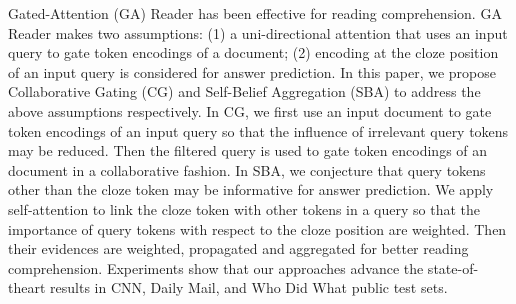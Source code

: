 Gated-Attention (GA) Reader has been effective for reading comprehension. GA Reader makes two assumptions: (1) a uni-directional attention that uses an input query to gate token encodings of a document; (2) encoding at the cloze position of an input query is considered for answer prediction. In this paper, we propose Collaborative Gating (CG) and Self-Belief Aggregation (SBA) to address the above assumptions respectively. In CG, we first use an input document to gate token encodings of an input query so that the influence of irrelevant query tokens may be reduced. Then the filtered query is used to gate token encodings of an document in a collaborative fashion. In SBA, we conjecture that query tokens other than the cloze token may be informative for answer prediction. We apply self-attention to link the cloze token with other tokens in a query so that the importance of query tokens with respect to the cloze position are weighted. Then their evidences are weighted, propagated and aggregated for better reading comprehension. Experiments show that our approaches advance the state-of-theart results in CNN, Daily Mail, and Who Did What public test sets.
